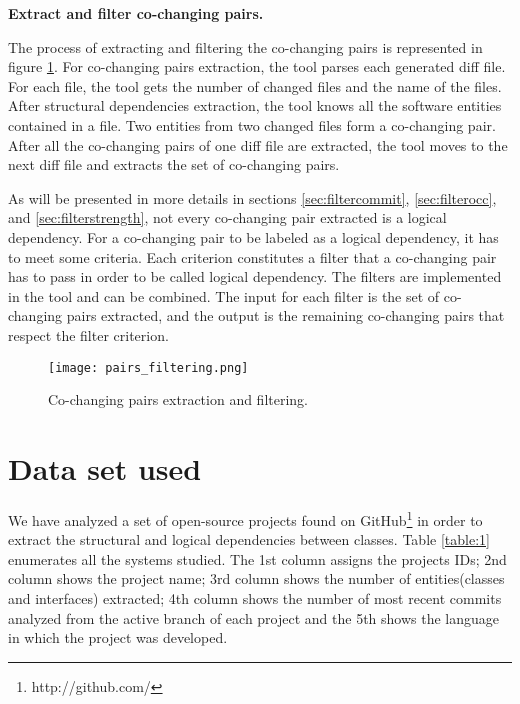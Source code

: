 \textbf{Extract and filter co-changing pairs.}

The process of extracting and filtering the co-changing pairs is represented in figure \ref{fig:figfiltering}.
For co-changing pairs extraction, the tool parses each generated diff file.
For each file, the tool gets the number of changed files and the name of the files. 
After structural dependencies extraction, the tool knows all the software entities contained in a file. Two entities from two changed files form a co-changing pair. After all the co-changing pairs of one diff file are extracted, the tool moves to the next diff file and extracts the set of co-changing pairs.

As will be presented in more details in sections \ref{sec:filtercommit}, \ref{sec:filterocc}, and \ref{sec:filterstrength}, not every co-changing pair extracted is a logical dependency. For a co-changing pair to be labeled as a logical dependency, it has to meet some criteria. Each criterion constitutes a filter that a co-changing pair has to pass in order to be called logical dependency.
The filters are implemented in the tool and can be combined. The input for each filter is the set of co-changing pairs extracted, and the output is the remaining co-changing pairs that respect the filter criterion.


\begin{figure}[H]
\centering
\texttt{[image: pairs\_filtering.png]}
\caption{Co-changing pairs extraction and filtering.}
\label{fig:figfiltering}
\end{figure}


\section{Data set used}
\label{sec:dataset}
We have analyzed a set of open-source projects found on GitHub\footnote{http://github.com/} \cite{Kalliamvakou2016} in order to extract the structural and logical dependencies between classes. Table \ref{table:1} enumerates all the systems studied. The 1st column assigns the projects IDs; 2nd column shows the project name; 3rd column shows the number of entities(classes and interfaces) extracted; 4th column shows the number of most recent commits analyzed from the active branch of each project and the 5th shows the language in which the project was developed.


